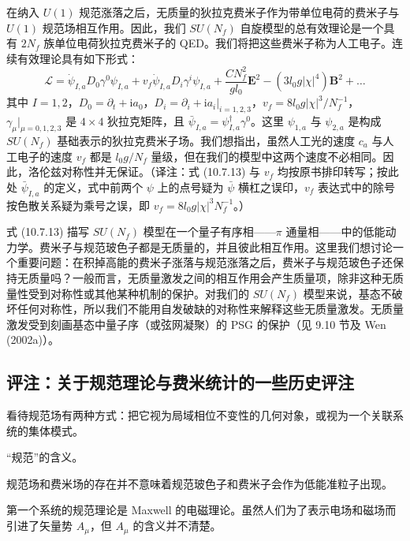 在纳入 $U(1)$ 规范涨落之后，无质量的狄拉克费米子作为带单位电荷的费米子与 $U(1)$ 规范场相互作用。因此，我们 $SU(N_f)$ 自旋模型的总有效理论是一个具有 $2N_f$ 族单位电荷狄拉克费米子的 QED。我们将把这些费米子称为人工电子。连续有效理论具有如下形式：
\begin{equation*}
\mathcal L=\dot\psi_{I,a}D_0\gamma^{0}\psi_{I,a}+v_f\dot\psi_{I,a}D_i\gamma^{i}\psi_{I,a}+\frac{CN_f^{2}}{gl_0}\pmb E^{2}-(3l_0g|\chi|^{4})\pmb B^{2}+\dots\tag{10.7.13}
\end{equation*}
其中 $I=1,2$，$D_0=\partial_t+\mathrm{i}a_0$，$D_i=\partial_i+\mathrm{i}a_i|_{i=1,2,3}$，$v_f=8l_0g|\chi|^{3}/N_f^{-1}$，$\gamma_\mu|_{\mu=0,1,2,3}$ 是 $4\times4$ 狄拉克矩阵，且 $\bar\psi_{I,a}=\psi^{\dagger}_{I,a}\gamma^{0}$。这里 $\psi_{1,a}$ 与 $\psi_{2,a}$ 是构成 $SU(N_f)$ 基础表示的狄拉克费米子场。我们想指出，虽然人工光的速度 $c_a$ 与人工电子的速度 $v_f$ 都是 $l_0g/N_f$ 量级，但在我们的模型中这两个速度不必相同。因此，洛伦兹对称性并无保证。（译注：式 (10.7.13) 与 $v_f$ 均按原书排印转写；按此处 $\bar\psi_{I,a}$ 的定义，式中前两个 $\psi$ 上的点号疑为 $\bar\psi$ 横杠之误印，$v_f$ 表达式中的除号按色散关系疑为乘号之误，即 $v_f=8l_0g|\chi|^{3}N_f^{-1}$。）

式 (10.7.13) 描写 $SU(N_f)$ 模型在一个量子有序相——$\pi$ 通量相——中的低能动力学。费米子与规范玻色子都是无质量的，并且彼此相互作用。这里我们想讨论一个重要问题：在积掉高能的费米子涨落与规范涨落之后，费米子与规范玻色子还保持无质量吗？一般而言，无质量激发之间的相互作用会产生质量项，除非这种无质量性受到对称性或其他某种机制的保护。对我们的 $SU(N_f)$ 模型来说，基态不破坏任何对称性，所以我们不能用自发破缺的对称性来解释这些无质量激发。无质量激发受到刻画基态中量子序（或弦网凝聚）的 PSG 的保护（见 9.10 节及 Wen (2002a)）。

\subsection{评注：关于规范理论与费米统计的一些历史评注}

\begin{keypoints}
\item 看待规范场有两种方式：把它视为局域相位不变性的几何对象，或视为一个关联系统的集体模式。
\item “规范”的含义。
\item 规范场和费米场的存在并不意味着规范玻色子和费米子会作为低能准粒子出现。
\end{keypoints}

第一个系统的规范理论是 Maxwell 的电磁理论。虽然人们为了表示电场和磁场而引进了矢量势 $A_\mu$，但 $A_\mu$ 的含义并不清楚。

